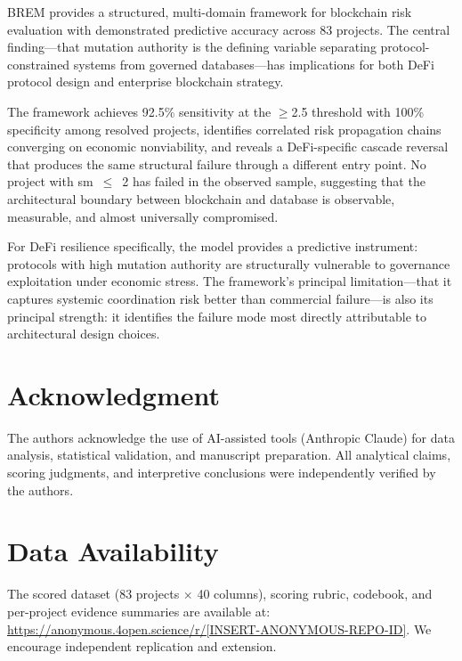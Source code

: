 \documentclass[conference]{IEEEtran}
\begin{document}
BREM provides a structured, multi-domain framework for blockchain risk evaluation with demonstrated predictive accuracy across 83 projects. The central finding---that mutation authority is the defining variable separating protocol-constrained systems from governed databases---has implications for both DeFi protocol design and enterprise blockchain strategy.

The framework achieves 92.5\% sensitivity at the $\geq$2.5 threshold with 100\% specificity among resolved projects, identifies correlated risk propagation chains converging on economic nonviability, and reveals a DeFi-specific cascade reversal that produces the same structural failure through a different entry point. No project with sm~$\leq$~2 has failed in the observed sample, suggesting that the architectural boundary between blockchain and database is observable, measurable, and almost universally compromised.

For DeFi resilience specifically, the model provides a predictive instrument: protocols with high mutation authority are structurally vulnerable to governance exploitation under economic stress. The framework's principal limitation---that it captures systemic coordination risk better than commercial failure---is also its principal strength: it identifies the failure mode most directly attributable to architectural design choices.

\section*{Acknowledgment}

The authors acknowledge the use of AI-assisted tools (Anthropic Claude) for data analysis, statistical validation, and manuscript preparation. All analytical claims, scoring judgments, and interpretive conclusions were independently verified by the authors.

\section*{Data Availability}

The scored dataset (83 projects $\times$ 40 columns), scoring rubric, codebook, and per-project evidence summaries are available at: \url{https://anonymous.4open.science/r/[INSERT-ANONYMOUS-REPO-ID]}. We encourage independent replication and extension.
\end{document}
